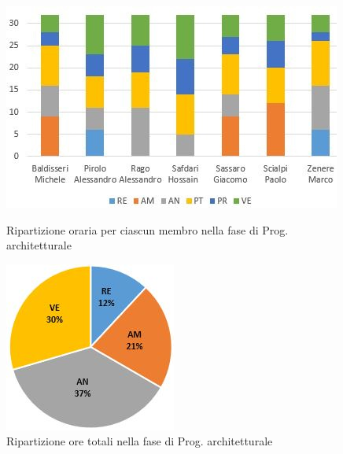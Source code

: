 \begin{figure}[!htb]
   \begin{minipage}{0.6\textwidth}
     \centering
     \includegraphics{Images/PO-Progettazione}
     \caption{Ripartizione oraria per ciascun membro nella fase di Prog. architetturale}
   \end{minipage}\hspace{0.1\textwidth}
   \begin{minipage}{0.3\textwidth}
     \centering
     \includegraphics[width=.9\textwidth]{Images/PE-Analisi}
     \captionsetup{width=.9\textwidth}
     \caption{Ripartizione ore totali nella fase di Prog. architetturale}
   \end{minipage}
\end{figure}